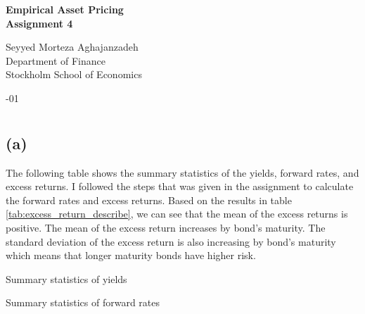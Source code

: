 \documentclass[hidelinks,12pt]{article}
\begin{document}
\begin{titlepage}
    \begin{center}
        \vspace*{1cm}
        
        
        
        \large
        \textbf{Empirical Asset Pricing \\ Assignment 4}
            
        
        \normalsize
        Seyyed Morteza Aghajanzadeh \\
        Department of Finance \\
        Stockholm School of Economics
        
        \vfill
            
        
        \vspace{0.8cm}
        \normalsize
        -01
            
    \end{center}
\end{titlepage}

\section{}
\subsection*{(a)}

The following table shows the summary statistics of the yields, forward rates, and excess returns. I followed the steps that was given in the assignment to calculate the forward rates and excess returns. Based on the results in table \ref{tab:excess_return_describe}, we can see that the mean of the excess returns is positive. The mean of the excess return increases by bond's maturity. The standard deviation of the excess return is also increasing by bond's maturity which means that longer maturity bonds have higher risk.

\begin{table}[htbp]
\centering
\caption{Summary statistics of yields}
\label{tab:yield_describe}
\resizebox{!}{!}{}
\end{table}

\begin{table}[htbp]
\centering
\caption{Summary statistics of forward rates}
\label{tab:forward_describe}
\resizebox{!}{!}{}
\end{table}
\end{document}

